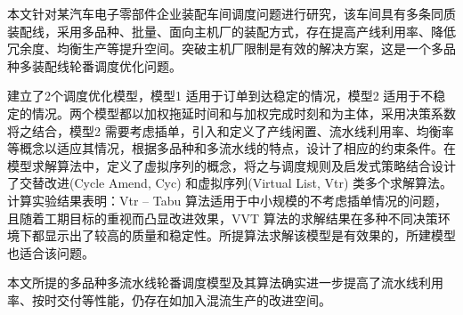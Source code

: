 本文针对某汽车电子零部件企业装配车间调度问题进行研究，该车间具有多条同质装配线，采用多品种、批量、面向主机厂的装配方式，存在提高产线利用率、降低冗余度、均衡生产等提升空间。突破主机厂限制是有效的解决方案，这是一个多品种多装配线轮番调度优化问题。

建立了$2$个调度优化模型，模型1 适用于订单到达稳定的情况，模型2 适用于不稳定的情况。两个模型都以加权拖延时间和与加权完成时刻和为主体，采用决策系数将之结合，模型2 需要考虑插单，引入和定义了产线闲置、流水线利用率、均衡率等概念以适应其情况，根据多品种和多流水线的特点，设计了相应的约束条件。在模型求解算法中，定义了虚拟序列的概念，将之与调度规则及启发式策略结合设计了交替改进(Cycle Amend, Cyc) 和虚拟序列(Virtual List, Vtr) 类多个求解算法。计算实验结果表明：Vtr -- Tabu 算法适用于中小规模的不考虑插单情况的问题，且随着工期目标的重视而凸显改进效果，VVT 算法的求解结果在多种不同决策环境下都显示出了较高的质量和稳定性。所提算法求解该模型是有效果的，所建模型也适合该问题。

本文所提的多品种多流水线轮番调度模型及其算法确实进一步提高了流水线利用率、按时交付等性能，仍存在如加入混流生产的改进空间。

